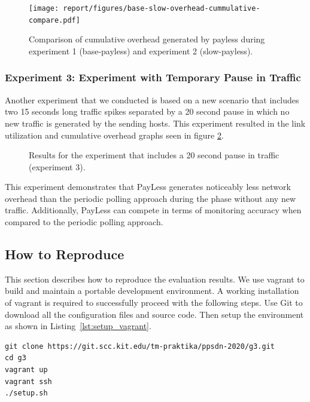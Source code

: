 \documentclass[DIV=12]{scrartcl}
\begin{document}
\begin{figure}[]
  \centering
  \texttt{[image: report/figures/base-slow-overhead-cummulative-compare.pdf]}
  \caption{Comparison of cumulative overhead generated by payless during experiment 1 (base-payless) and experiment 2 (slow-payless).}
  \label{fig:overhead_compare_base_slow}
\end{figure}

\subsubsection{Experiment 3: Experiment with Temporary Pause in Traffic}

Another experiment that we conducted is based on a new scenario that includes
two 15 seconds long traffic spikes separated by a 20 second pause in which no new traffic is generated by the sending hosts. This experiment resulted in the link utilization and cumulative overhead graphs seen in figure
\ref{fig:experiment3}.

\begin{figure}%
    \centering
    \caption{Results for the experiment that includes a 20 second pause in traffic (experiment 3).}%
    \label{fig:experiment3}%
\end{figure}

This experiment demonstrates that PayLess generates noticeably less network overhead than the periodic polling approach during the phase without any new traffic. Additionally, PayLess can compete in terms of monitoring accuracy when compared to the periodic polling approach. 

\subsection{How to Reproduce}

This section describes how to reproduce the evaluation results.
We use vagrant to build and maintain a portable development environment.
A working installation of vagrant is required to successfully proceed with the following steps. Use Git to download all the configuration files and source code.
Then setup the environment as shown in Listing~\ref{lst:setup_vagrant}.

\begin{lstlisting}[float=htbp, caption={Setup vagrant}, label={lst:setup_vagrant}]
git clone https://git.scc.kit.edu/tm-praktika/ppsdn-2020/g3.git
cd g3
vagrant up
vagrant ssh
./setup.sh
\end{lstlisting}
\end{document}
